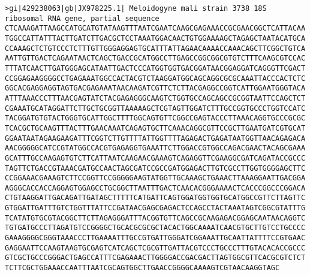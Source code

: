 \documentclass[11pt]{article}
\begin{document}
\begin{Verbatim}[commandchars=\\\{\}]
>gi|429238063|gb|JX978225.1| Meloidogyne mali strain 3738 18S ribosomal RNA gene, partial sequence
CTCAAAGATTAAGCCATGCATGTATAAGTTTAATCGAATCAAGCGAGAAACCGCGAACGGCTCATTACAA
TGGCCATTATTTACTTGATCTTGACGCTCCTAAATGGACAACTGTGGAAAAGCTAGAGCTAATACATGCA
CCAAAGCTCTGTCCCTCTTTGTTGGGAGGAGTGCATTTATTAGAACAAAACCAAACAGCTTCGGCTGTCA
AATTGTTGACTCAGAATAACTCAGCTGACCGCATGGCCTTGAGCCGGCGGCGTGTCTTTCAAGCGTCCAC
TTTATCAACTTGATGGGAGCATAATTGACTCCCATGGTGGTGACGGATAACGGAGGATCAGGGTTCGACT
CCGGAGAAGGGGCCTGAGAAATGGCCACTACGTCTAAGGATGGCAGCAGGCGCGCAAATTACCCACTCTC
GGCACGAGGAGGTAGTGACGAGAAATAACAAGATCGTTCTCTTACGAGGCCGGTCATTGGAATGGGTACA
ATTTAAACCCTTTAACGAGTATCTACGAGAGGGCAAGTCTGGTGCCAGCAGCCGCGGTAATTCCAGCTCT
CGAAATGCATAGGATTCTTGCTGCGGTTAAAAAGCTCGTAGTTGGATCTTTGCCGGTGCCCTGGTCCATC
TACGGATGTGTACTGGGTGCATTGGCTTTTGGCAGTGTTCGGCCGAGTACCCTTAAACAGGTGCCCGCGC
TCACGCTGCAAGTTTACTTTGAACAAATCAGAGTGCTTCAAACAGGCGTTCCGCTTGAATGATCGTGCAT
GGAATAATAGAAGAAGATTTCGGTCTTGTTTTATTGGTTTTAGAGACTGAGATAATGGTTAACAGAGACA
AACGGGGGCATCCGTATGGCCACGTGAGAGGTGAAATTCTTGGACCGTGGCCAGACGAACTACAGCGAAA
GCATTTGCCAAGAGTGTCTTCATTAATCAAGAACGAAAGTCAGAGGTTCGAAGGCGATCAGATACCGCCC
TAGTTCTGACCGTAAACGATGCCAACTAGCGATCCGCCGATGGAGACTTGTCGCCTTGGTGGGGAGCTTC
CCGGAAACGAAAGTCTTCCGGTTCCGGGGGAAGTATGGTTGCAAAGCTGAAACTTAAAGGAATTGACGGA
AGGGCACCACCAGGAGTGGAGCCTGCGGCTTAATTTGACTCAACACGGGAAAACTCACCCGGCCCGGACA
CTGTAAGGATTGACAGATTGATAGCTTTTTCATGATTCAGTGGATGGTGGTGCATGGCCGTTCTTAGTTC
GTGGATTGATTTGTCTGGTTTATTCCGATAACGAGCGAGACTCCAGCCTACTAAATAGTCGGCGTATTTG
TCATATGTGCGTACGGCTTCTTAGAGGGATTTACGGTGTTCAGCCGCAAGAGACGGAGCAATAACAGGTC
TGTGATGCCCTTAGATGTCCGGGGCTGCACGCGCGCTACACTGGCAAAATCAACGTGCTTGTCCTGCCCC
GAAAGGGGCGGGTAAACCCTTGAAAATTTGCCGTGATTGGGATCGGAAATTGCAATTATTTTCCGTGAAC
GAGGAATTCCAAGTAAGTGCGAGTCATCAGCTCGCGTTGATTACGTCCCTGCCCTTTGTACACACCGCCC
GTCGCTGCCCGGGACTGAGCCATTTCGAGAAACTTGGGGACCGACGACTTAGTGGCGTTCACGCGTCTCT
TCTTCGCTGGAAACCAATTTAATCGCAGTGGCTTGAACCGGGGCAAAAGTCGTAACAAGGTAGC


\end{Verbatim}
\end{document}
